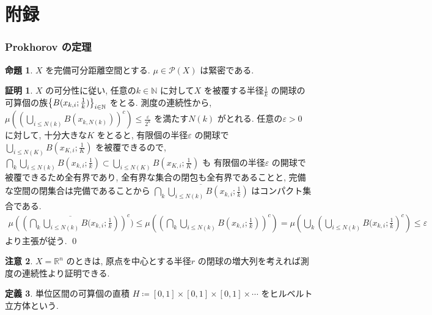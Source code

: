 \documentclass[10pt, fleqn, label-section=none, titlepage]{bxjsarticle}
\theoremstyle{definition}
\newtheorem{dfn}{定義}[section]
\newtheorem{prop}[dfn]{命題}
\newtheorem*{pf*}{証明}
\newtheorem{remark}[dfn]{注意}
\newcommand{\veps}{\varepsilon}
\newcommand{\cbra}[1]{\mleft\{#1\mright\}}
\newcommand{\Rn}{\mathbb{R}^n}
\renewcommand{\;}{\, ; \,}
\begin{document}
\newpage
\appendix
\setcounter{part}{0}
\part*{附録}
\section{Prokhorov の定理}

\begin{prop}
\label{1420}
$X$ を完備可分距離空間とする. $\mu \in \mathcal{P}(X)$ は緊密である.
\end{prop}
\begin{pf*}
$X$ の可分性に従い, 任意の$k \in \mathbb{N}$ に対して$X$ を被覆する半径$\frac{1}{k}  $ の開球の可算個の族$\cbra{B(x_{k,i} ; \frac{1}{k})}_{i\in \mathbb{N}}$ をとる. 測度の連続性から, $\mu ((\bigcup_{i \leq N(k)} B(x_{k,N(k)})  )^c) \leq \frac{\veps}{2^k}  $ を満たす$N(k)$ がとれる. 任意の$\veps > 0 $ に対して, 十分大きな$K$ をとると, 有限個の半径$\veps$ の開球で $\bigcup_{i \leq N(K)} B(x_{K,i};\frac{1}{K}  )$ を被覆できるので, \\
$\bigcap_{k} \bigcup_{i \leq N(k)} B(x_{k,i} ; \frac{1}{k}) \subset \bigcup_{i \leq N(K)} B(x_{K,i} ; \frac{1}{K}  )$ も
有限個の半径$\veps$ の開球で被覆できるため全有界であり, 全有界な集合の閉包も全有界であることと, 完備な空間の閉集合は完備であることから $\overline{\bigcap_{k} \bigcup_{i \leq N(k)} B(x_{k,i}; \frac{1}{k} ) }$ はコンパクト集合である. 
\begin{align*}
\mu ((\overline{\bigcap_{k} \bigcup_{i \leq N(k)} B(x_{k,i} ; \frac{1}{k}  }))^c ) \leq \mu ((\bigcap_{k} \bigcup_{i \leq N(k)} B(x_{k,i}; \frac{1}{k}  ) )^c) = \mu( \bigcup_{k}({ \bigcup_{i \leq N(k)} B(x_{k,i}; \frac{1}{k}  } )^c ) \leq \veps
\end{align*}
より主張が従う.
\qed
\end{pf*}

\begin{remark}
$X = \Rn$ のときは, 原点を中心とする半径$r$ の閉球の増大列を考えれば測度の連続性より証明できる.
\end{remark}


\begin{dfn}
単位区間の可算個の直積 $H \coloneqq [0,1]\times[0,1]\times[0,1] \times \cdots $ をヒルベルト立方体という.
\end{dfn}
\end{document}
